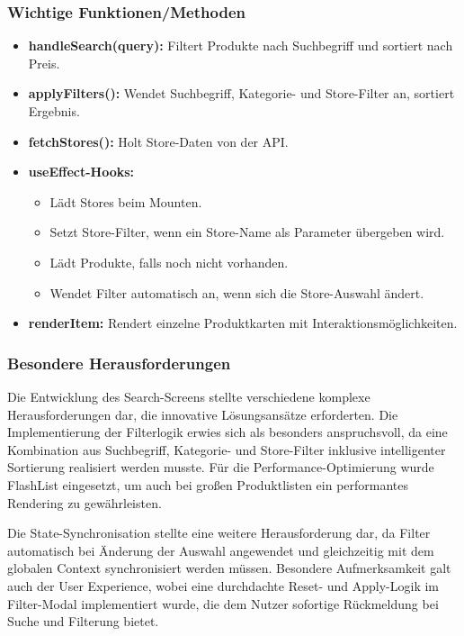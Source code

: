 \documentclass[12pt, a4paper]{report} %
\begin{document}
\subsubsection{Wichtige Funktionen/Methoden}
\begin{itemize}
    \item \textbf{handleSearch(query):} Filtert Produkte nach Suchbegriff und sortiert nach Preis.
    \item \textbf{applyFilters():} Wendet Suchbegriff, Kategorie- und Store-Filter an, sortiert Ergebnis.
    \item \textbf{fetchStores():} Holt Store-Daten von der API.
    \item \textbf{useEffect-Hooks:}
    \begin{itemize}
        \item Lädt Stores beim Mounten.
        \item Setzt Store-Filter, wenn ein Store-Name als Parameter übergeben wird.
        \item Lädt Produkte, falls noch nicht vorhanden.
        \item Wendet Filter automatisch an, wenn sich die Store-Auswahl ändert.
    \end{itemize}
    \item \textbf{renderItem:} Rendert einzelne Produktkarten mit Interaktionsmöglichkeiten.
\end{itemize}

\subsubsection{Besondere Herausforderungen}
Die Entwicklung des Search-Screens stellte verschiedene komplexe Herausforderungen dar, die innovative Lösungsansätze erforderten. Die Implementierung der Filterlogik erwies sich als besonders anspruchsvoll, da eine Kombination aus Suchbegriff, Kategorie- und Store-Filter inklusive intelligenter Sortierung realisiert werden musste. Für die Performance-Optimierung wurde FlashList eingesetzt, um auch bei großen Produktlisten ein performantes Rendering zu gewährleisten.

Die State-Synchronisation stellte eine weitere Herausforderung dar, da Filter automatisch bei Änderung der Auswahl angewendet und gleichzeitig mit dem globalen Context synchronisiert werden müssen. Besondere Aufmerksamkeit galt auch der User Experience, wobei eine durchdachte Reset- und Apply-Logik im Filter-Modal implementiert wurde, die dem Nutzer sofortige Rückmeldung bei Suche und Filterung bietet.
\end{document}
